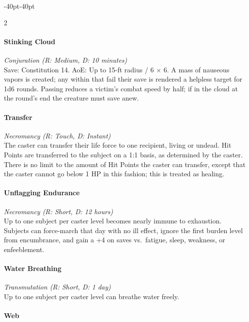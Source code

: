 \documentclass{book}
\begin{document}
\begin{adjustwidth}{-40pt}{-40pt}
\begin{multicols}{2}
\paragraph{Stinking Cloud}\label{stinking-cloud}

\emph{Conjuration (R: Medium, D: 10 minutes)}\\
Save: Constitution 14. AoE: Up to 15-ft radius / 6 × 6. A mass of
nauseous vapors is created; any within that fail their save is rendered
a helpless target for 1d6 rounds. Passing reduces a victim's combat
speed by half; if in the cloud at the round's end the creature must save
anew.

\paragraph{Transfer}\label{transfer}

\emph{Necromancy (R: Touch, D: Instant)}\\
The caster can transfer their life force to one recipient, living or
undead. Hit Points are transferred to the subject on a 1:1 basis, as
determined by the caster. There is no limit to the amount of Hit Points
the caster can transfer, except that the caster cannot go below 1 HP in
this fashion; this is treated as healing.

\paragraph{Unflagging Endurance}\label{unflagging-endurance}

\emph{Necromancy (R: Short, D: 12 hours)}\\
Up to one subject per caster level becomes nearly immune to exhaustion.
Subjects can force-march that day with no ill effect, ignore the first
burden level from encumbrance, and gain a +4 on saves vs.~fatigue,
sleep, weakness, or enfeeblement.

\paragraph{Water Breathing}\label{water-breathing}

\emph{Transmutation (R: Short, D: 1 day)}\\
Up to one subject per caster level can breathe water freely.

\paragraph{Web}\label{web}


\end{multicols}
\end{adjustwidth}
\end{document}
